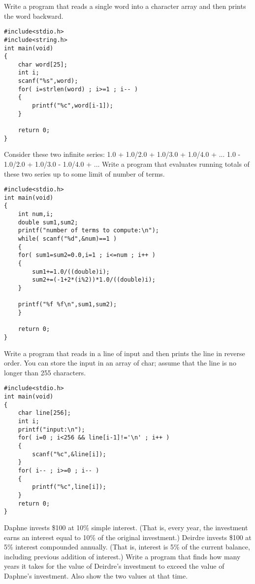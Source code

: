 \begin{question}
  Write a program that reads a single word into a character array and then prints the word
  backward.
\end{question}
\begin{solution}
  \begin{verbatim}
#include<stdio.h>
#include<string.h>
int main(void)
{
	char word[25];
	int i;
	scanf("%s",word);
	for( i=strlen(word) ; i>=1 ; i-- )
	{
		printf("%c",word[i-1]);
	}
	
	return 0;
}
  \end{verbatim}
\end{solution}
\begin{question}
  Consider these two infinite series:
1.0 + 1.0/2.0 + 1.0/3.0 + 1.0/4.0 + ...
1.0 - 1.0/2.0 + 1.0/3.0 - 1.0/4.0 + ...
Write a program that evaluates running totals of these two series up to some limit of
number of terms.
\end{question}
\begin{solution}
  \begin{verbatim}
#include<stdio.h>
int main(void)
{
	int num,i;
	double sum1,sum2;
	printf("number of terms to compute:\n");
	while( scanf("%d",&num)==1 )
	{
	for( sum1=sum2=0.0,i=1 ; i<=num ; i++ )
	{
		sum1+=1.0/((double)i);
		sum2+=(-1+2*(i%2))*1.0/((double)i);
	}
	
	printf("%f %f\n",sum1,sum2);
	}

	return 0;
}
  \end{verbatim}
\end{solution}
\begin{question}
  Write a program that reads in a line of input and then prints the line in reverse order.
You can store the input in an array of char; assume that the line is no longer than 255
characters.
\end{question}
\begin{solution}
  \begin{verbatim}
#include<stdio.h>
int main(void)
{
	char line[256];
	int i;
	printf("input:\n");
	for( i=0 ; i<256 && line[i-1]!='\n' ; i++ )
	{
		scanf("%c",&line[i]);
	}
	for( i-- ; i>=0 ; i-- )
	{
		printf("%c",line[i]);
	}
	return 0;
}
  \end{verbatim}
\end{solution}
\begin{question}
Daphne invests \$100 at 10\% simple interest. (That is, every year, the investment earns
an interest equal to 10\% of the original investment.) Deirdre invests \$100 at 5\% interest
compounded annually. (That is, interest is 5\% of the current balance, including previous
addition of interest.) Write a program that finds how many years it takes for the value
of Deirdre’s investment to exceed the value of Daphne’s investment. Also show the two
values at that time.
\end{question}
